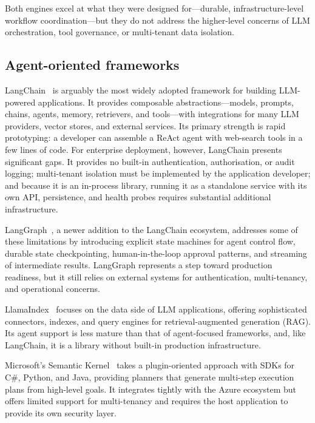 \documentclass[a4paper]{sapthesis}
\begin{document}
Both engines excel at what they were designed for---durable, infrastructure-level
workflow coordination---but they do not address the higher-level concerns
of LLM orchestration, tool governance, or multi-tenant data isolation.

\subsection{Agent-oriented frameworks}

LangChain~\cite{langchain2023} is arguably the most widely adopted
framework for building LLM-powered applications.  It provides composable
abstractions---models, prompts, chains, agents, memory, retrievers, and
tools---with integrations for many LLM providers, vector
stores, and external services.  Its primary strength is rapid prototyping:
a developer can assemble a ReAct agent with web-search tools in a few
lines of code.  For enterprise deployment, however, LangChain presents
significant gaps.  It provides no built-in authentication, authorisation,
or audit logging; multi-tenant isolation must be implemented by the
application developer; and because it is an in-process library, running it
as a standalone service with its own API, persistence, and health probes
requires substantial additional infrastructure.

LangGraph~\cite{langgraph2024}, a newer addition to the LangChain
ecosystem, addresses some of these limitations by introducing explicit
state machines for agent control flow, durable state checkpointing,
human-in-the-loop approval patterns, and streaming of intermediate
results.  LangGraph represents a step toward production readiness, but it
still relies on external systems for authentication, multi-tenancy, and
operational concerns.

LlamaIndex~\cite{llamaindex2023} focuses on the data side of LLM
applications, offering sophisticated connectors, indexes, and query engines
for retrieval-augmented generation (RAG).  Its agent support is less mature
than that of agent-focused frameworks, and, like LangChain, it is a
library without built-in production infrastructure.

Microsoft's Semantic Kernel~\cite{semantickernel2023} takes a
plugin-oriented approach with SDKs for C\#, Python, and Java, providing
planners that generate multi-step execution plans from high-level goals.
It integrates tightly with the Azure ecosystem but offers limited support
for multi-tenancy and requires the host application to provide its own
security layer.
\end{document}
